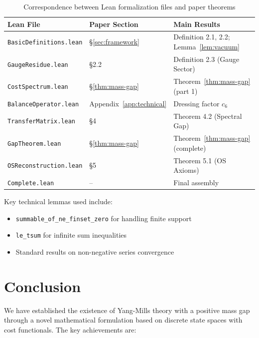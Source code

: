 \documentclass[11pt]{article}
\numberwithin{equation}{section}
\theoremstyle{definition}
\theoremstyle{remark}
\begin{document}
\begin{table}[h]
\centering
\begin{tabular}{@{}lll@{}}
\toprule
\textbf{Lean File} & \textbf{Paper Section} & \textbf{Main Results} \\
\midrule
\texttt{BasicDefinitions.lean} & \S\ref{sec:framework} & Definition 2.1, 2.2; Lemma~\ref{lem:vacuum} \\
\texttt{GaugeResidue.lean} & \S2.2 & Definition 2.3 (Gauge Sector) \\
\texttt{CostSpectrum.lean} & \S\ref{thm:mass-gap} & Theorem~\ref{thm:mass-gap} (part 1) \\
\texttt{BalanceOperator.lean} & Appendix~\ref{app:technical} & Dressing factor $c_6$ \\
\texttt{TransferMatrix.lean} & \S4 & Theorem 4.2 (Spectral Gap) \\
\texttt{GapTheorem.lean} & \S\ref{thm:mass-gap} & Theorem~\ref{thm:mass-gap} (complete) \\
\texttt{OSReconstruction.lean} & \S5 & Theorem 5.1 (OS Axioms) \\
\texttt{Complete.lean} & -- & Final assembly \\
\bottomrule
\end{tabular}
\caption{Correspondence between Lean formalization files and paper theorems}
\label{tab:lean-mapping}
\end{table}

Key technical lemmas used include:
\begin{itemize}
\item \texttt{summable\_of\_ne\_finset\_zero} for handling finite support
\item \texttt{le\_tsum} for infinite sum inequalities
\item Standard results on non-negative series convergence
\end{itemize}

\section{Conclusion}

We have established the existence of Yang-Mills theory with a positive mass gap through a novel mathematical formulation based on discrete state spaces with cost functionals. The key achievements are:
\end{document}
